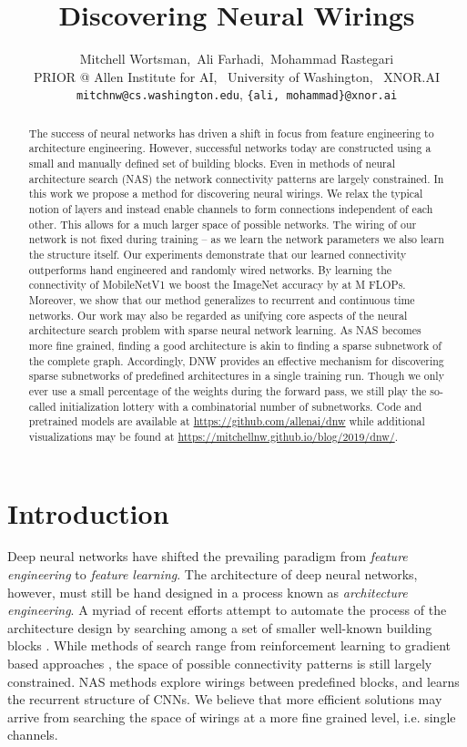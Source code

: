\documentclass{article}
\title{Discovering Neural Wirings}
\author{Mitchell Wortsman,\ Ali Farhadi,\  Mohammad Rastegari \\
  PRIOR @ Allen Institute for AI, \
  University of Washington, \
  XNOR.AI \\
  \texttt{mitchnw@cs.washington.edu},  \texttt{\{ali, mohammad\}@xnor.ai}
}
\begin{document}
\maketitle

\begin{abstract}
The success of neural networks has driven a shift in focus from feature engineering to architecture engineering. However, successful networks today are constructed using a small and manually defined set of building blocks. Even in methods of neural architecture search (NAS) the network connectivity patterns are largely constrained. In this work we propose a method for discovering neural wirings. We relax the typical notion of layers and instead enable channels to form connections independent of each other. This allows for a much larger space of possible networks. The wiring of our network is not fixed during training -- as we learn the network parameters we also learn the structure itself. Our experiments demonstrate that our learned connectivity outperforms hand engineered and randomly wired networks. By learning the connectivity of MobileNetV1 \cite{mobilenetv1} we boost the ImageNet accuracy by  at M FLOPs. Moreover, we show that our method generalizes to recurrent and continuous time networks.
Our work may also be regarded as unifying core aspects of the neural architecture search problem with sparse neural network learning. As NAS becomes more fine grained, finding a good architecture is akin to finding a sparse subnetwork of the complete graph. Accordingly, DNW provides an effective mechanism for discovering sparse subnetworks of predefined architectures in a single training run. Though we only ever use a small percentage of the weights during the forward pass, we still play the so-called initialization lottery \cite{lth} with a combinatorial number of subnetworks. Code and pretrained models are available at \url{https://github.com/allenai/dnw} while additional visualizations may be found at \url{https://mitchellnw.github.io/blog/2019/dnw/}.

\end{abstract}

\section{Introduction}
Deep neural networks have shifted the prevailing paradigm from \emph{feature engineering} to \emph{feature learning}. The architecture of deep neural networks, however, must still be hand designed in a process known as \emph{architecture engineering}. A myriad of recent efforts attempt to automate the process of the architecture design by searching among a set of smaller well-known building blocks \cite{mnasnet,wu2018fbnet,zoph2016neural,liu2018progressive,cai2018proxylessnas,darts}. While methods of search range from reinforcement learning to gradient based approaches \cite{wu2018fbnet, darts}, the space of possible connectivity patterns is still largely constrained. NAS methods explore wirings between predefined blocks, and \cite{Savarese2019LearningIR} learns the recurrent structure of CNNs. We believe that more efficient solutions may arrive from searching the space of wirings at a more fine grained level, i.e. single channels. 
\end{document}
